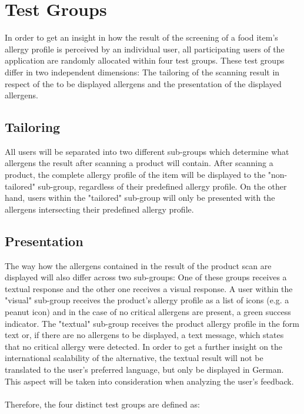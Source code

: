 \section{Test Groups}
In order to get an insight in how the result of the screening of a food item’s allergy profile is perceived by an individual user, all participating users of the application are randomly allocated within four test groups. These test groups differ in two independent dimensions: The tailoring of the scanning result in respect of the to be displayed allergens and the presentation of the displayed allergens.

\subsection{Tailoring}
All users will be separated into two different sub-groups which determine what allergens the result after scanning a product will contain. After scanning a product, the complete allergy profile of the item will be displayed to the "non-tailored" sub-group, regardless of their predefined allergy profile. On the other hand, users within the "tailored" sub-group will only be presented with the allergens intersecting their predefined allergy profile.

\subsection{Presentation}
The way how the allergens contained in the result of the product scan are displayed will also differ across two sub-groups: One of these groups receives a textual response and the other one receives a visual response. A user within the "visual" sub-group receives the product's allergy profile as a list of icons (e.g. a peanut icon) and in the case of no critical allergens are present, a green success indicator. The "textual" sub-group receives the product allergy profile in the form text or, if there are no allergens to be displayed, a text message, which states that no critical allergy were detected. In order to get a further insight on the international scalability of the alternative, the textual result will not be translated to the user's preferred language, but only be displayed in German. This aspect will be taken into consideration when analyzing the user's feedback.\\
\\
Therefore, the four distinct test groups are defined as:



